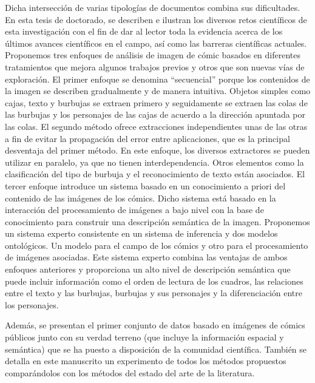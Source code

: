 Dicha intersección de varias tipologías de documentos combina sus dificultades.
En esta tesis de doctorado, se describen e ilustran los diversos retos científicos de esta investigación con el fin de dar al lector toda la evidencia acerca de los últimos avances científicos en el campo, así como las barreras científicas actuales.
Proponemos tres enfoques de análisis de imagen de cómic basados en diferentes tratamientos que mejora algunos trabajos previos y otros que son nuevas vías de exploración.
El primer enfoque se denomina ``secuencial'' porque los contenidos de la imagen se describen gradualmente y de manera intuitiva.
Objetos simples como cajas, texto y burbujas se extraen primero y seguidamente se extraen las colas de las burbujas y los personajes de las cajas de acuerdo a la dirección apuntada por las colas.
El segundo método ofrece extracciones independientes unas de las otras a fin de evitar la propagación del error entre aplicaciones, que es la principal desventaja del primer método.
En este enfoque, los diversos extractores se pueden utilizar en paralelo, ya que no tienen interdependencia.
Otros elementos como la clasificación del tipo de burbuja y el reconocimiento de texto están asociados.
El tercer enfoque introduce un sistema basado en un conocimiento a priori del contenido de las imágenes de los cómics. Dicho sistema está basado en la interacción del procesamiento de imágenes a bajo nivel con la base de conocimiento para construir una descripción semántica de la imagen.
Proponemos un sistema experto consistente en un sistema de inferencia y dos modelos ontológicos. Un modelo para el campo de los cómics y otro para el procesamiento de imágenes asociadas.
Este sistema experto combina las ventajas de ambos enfoques anteriores y proporciona un alto nivel de descripción semántica que puede incluir información como el orden de lectura de los cuadros, las relaciones entre el texto y las burbujas, burbujas y sus personajes y la diferenciación entre los personajes.

Además, se presentan el primer conjunto de datos basado en imágenes de cómics públicos junto con su verdad terreno (que incluye la información espacial y semántica) que se ha puesto a disposición de la comunidad científica.
También se detalla en este manuscrito un experimento de todos los métodos propuestos comparándolos con los métodos del estado del arte de la literatura.

